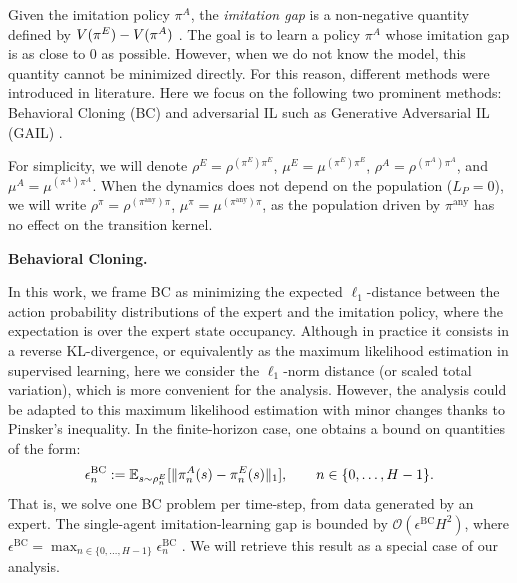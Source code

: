 \documentclass{article}
\begin{document}
Given the imitation policy $\pi^A$, the \emph{imitation gap} is a non-negative quantity defined by $V(\pi^E) - V(\pi^A)$ \cite{swamy2021}. 
The goal is to learn a policy $\pi^A$ whose imitation gap is as close to $0$ as possible. 
However, when we do not know the model, this quantity cannot be minimized directly. 
For this reason, different methods were introduced in literature. 
Here we focus on the following two prominent methods: Behavioral Cloning (BC) \cite{pomerleau1991efficient} and adversarial IL such as Generative Adversarial IL (GAIL) \cite{ho2016generative}.

For simplicity, we will denote $\rho^E = \rho^{(\pi^E)\pi^E}$, $\mu^E = \mu^{(\pi^E)\pi^E}$, $\rho^A = \rho^{(\pi^A)\pi^A}$, and $\mu^A = \mu^{(\pi^A)\pi^A}$. When the dynamics does not depend on the population ($L_P=0$), we will write $\rho^{\pi} = \rho^{(\pi^{\text{any}})\pi}$, $\mu^{\pi} = \mu^{(\pi^{\text{any}})\pi}$, as the population driven by $\pi^{\text{any}}$ has no effect on the transition kernel.


\textbf{Behavioral Cloning. } 

In this work, we frame BC as minimizing the expected $\ell_1$-distance between the action probability distributions of the expert and the imitation policy, where the expectation is over the expert state occupancy. Although in practice it consists in a reverse KL-divergence, or 
equivalently as the maximum likelihood estimation in supervised learning, here we consider the $\ell_1$-norm distance (or scaled total variation), which is more convenient for the analysis. However, the analysis could be adapted to this maximum likelihood estimation with minor changes thanks to Pinsker's inequality. 
In the finite-horizon case, one obtains a bound on quantities of the form:
\begin{equation}
\label{eq:BC}
    \epsilon^{\mathrm{BC}}_n := \mathbb{E}_{s\sim \rho_n^E}[\|\pi^A_n(s) - \pi^E_n(s)\|_1], \qquad n \in \{0, \dots, H-1\}.
\end{equation}
That is, we solve one BC problem per time-step, from data generated by an expert. The single-agent imitation-learning gap is bounded by $\mathcal{O}\left(\epsilon^{\mathrm{BC}} H^2\right)$, where $\epsilon^{\mathrm{BC}} = \max_{n\in\{0,\dots,H-1\}}\epsilon^{\mathrm{BC}}_n$ \cite{ross2010efficient}.
We will retrieve this result as a special case of our analysis.
\end{document}
